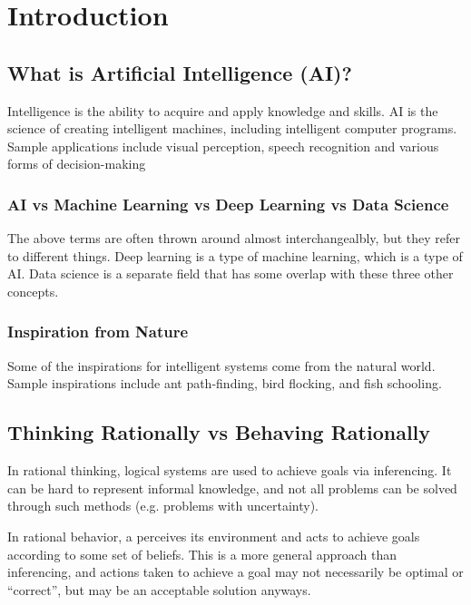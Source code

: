\documentclass[12pt,titlepage]{article}
\begin{document}
  \newpage

  \section{Introduction}

    \subsection{What is Artificial Intelligence (AI)?}
      Intelligence is the ability to acquire and apply knowledge and skills. AI is the science of creating intelligent machines,
      including intelligent computer programs. Sample applications include visual perception, speech recognition and various
      forms of decision-making

      \subsubsection{AI vs Machine Learning vs Deep Learning vs Data Science}
        The above terms are often thrown around almost interchangealbly, but they refer to different things. Deep learning is
        a type of machine learning, which is a type of AI. Data science is a separate field that has some overlap with these
        three other concepts.

      \subsubsection{Inspiration from Nature}
        Some of the inspirations for intelligent systems come from the natural world. Sample inspirations include ant path-finding,
        bird flocking, and fish schooling.

    \subsection{Thinking Rationally vs Behaving Rationally}
      In rational thinking, logical systems are used to achieve goals via inferencing. It can be hard to represent informal knowledge,
      and not all problems can be solved through such methods (e.g. problems with uncertainty).

      In rational behavior, a perceives its environment and acts to achieve goals according to some set of beliefs. This is a more
      general approach than inferencing, and actions taken to achieve a goal may not necessarily be optimal or ``correct'', but
      may be an acceptable solution anyways.
      
\end{document}
